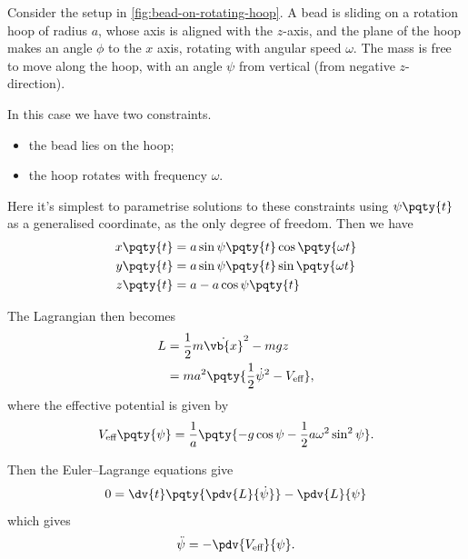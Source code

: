 \begin{example}
    Consider the setup in \autoref{fig:bead-on-rotating-hoop}. A bead is sliding on a rotation hoop of radius \(a\), whose axis is aligned with the \(z\)-axis, and the plane of the hoop makes an angle \(\phi\) to the \(x\) axis, rotating with angular speed \(\omega\). The mass is free to move along the hoop, with an angle \(\psi\) from vertical (from negative \(z\)-direction).

    In this case we have two constraints.
    \begin{itemize}
        \item the bead lies on the hoop;
        \item the hoop rotates with frequency \(\omega\).
    \end{itemize}

    Here it's simplest to parametrise solutions to these constraints using \(\psi\pqty{t}\) as a generalised coordinate, as the only degree of freedom. Then we have
    \begin{subequations}
        \begin{align}
            x\pqty{t} &= a \sin \psi\pqty{t} \cos \pqty{\omega t} \\
            y\pqty{t} &= a \sin \psi\pqty{t} \sin \pqty{\omega t} \\
            z\pqty{t} &= a - a \cos \psi\pqty{t}
        \end{align}
    \end{subequations}
    
    The Lagrangian then becomes
    \begin{subequations}
        \begin{align}
            L &= \frac{1}{2} m \dot{\vb{x}}^2 - mg z \\
            &= ma^2 \pqty{\frac{1}{2} \dot{\psi}^2 - V_{\text{eff}}},
        \end{align}
    \end{subequations}
    where the effective potential is given by
    \begin{equation}
        V_{\text{eff}} \pqty{\psi} = \frac{1}{a} \pqty{- g \cos \psi - \frac{1}{2} a \omega^2 \sin^2 \psi}.
    \end{equation}

    Then the Euler--Lagrange equations give
    \begin{equation}
        0 = \dv{t} \pqty{\pdv{L}{\dot{\psi}}} - \pdv{L}{\psi}
    \end{equation}
    which gives
    \begin{equation}
        \ddot{\psi} = - \pdv{V_{\text{eff}}}{\psi}.
    \end{equation}


\end{example}
